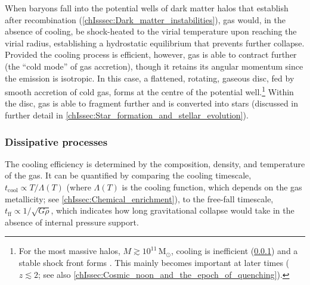 When baryons fall into the potential wells of dark matter halos that establish after recombination (\cref{chIsssec:Dark_matter_instabilities}), gas would, in the absence of cooling, be shock-heated to the virial temperature upon reaching the virial radius, establishing a hydrostatic equilibrium that prevents further collapse. Provided the cooling process is efficient, however, gas is able to contract further (the ``cold mode'' of gas accretion), though it retains its angular momentum since the emission is isotropic. In this case, a flattened, rotating, gaseous disc, fed by smooth accretion of cold gas, forms at the centre of the potential well.\footnote{For the most massive halos, $M \gtrsim 10^{11} \, \mathrm{M_\odot}$, cooling is inefficient (\cref{chIsssec:Dissipative_processes}) and a stable shock front forms \citep[``hot-mode'' accretion;][]{2003MNRAS.345..349B}. This mainly becomes important at later times ($z \lesssim 2$; see also \cref{chIssec:Cosmic_noon_and_the_epoch_of_quenching}).} Within the disc, gas is able to fragment further and is converted into stars (discussed in further detail in \cref{chIssec:Star_formation_and_stellar_evolution}).

\subsubsection{Dissipative processes}
\label{chIsssec:Dissipative_processes}

The cooling efficiency is determined by the composition, density, and temperature of the gas. It can be quantified by comparing the cooling timescale, $t_\text{cool} \propto T/\Lambda(T)$ (where $\Lambda(T)$ is the cooling function, which depends on the gas metallicity; see \cref{chIssec:Chemical_enrichment}), to the free-fall timescale, $t_\text{ff} \propto 1/\sqrt{G\rho}$, which indicates how long gravitational collapse would take in the absence of internal pressure support.

